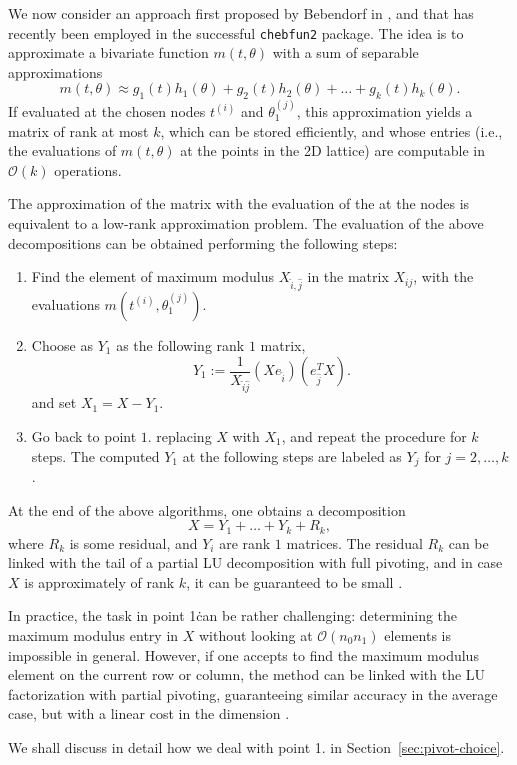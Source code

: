 \documentclass[]{article}
\begin{document}
We now consider an approach first proposed by Bebendorf 
in \cite{bebendorf2003adaptive}, and that has recently been employed in 
the successful \texttt{chebfun2} package. The idea is 
to approximate a bivariate function $m(t, \theta)$ with a 
sum of separable approximations
\[
    m(t, \theta) \approx 
      g_1(t) h_1(\theta) + g_2(t) h_2(\theta) + \ldots 
      + g_k(t) h_k(\theta). 
\]
If evaluated at the chosen nodes $t^{(i)}$ and 
$\theta_1^{(j)}$, this approximation yields a matrix 
of rank at most $k$, which can be stored efficiently, and 
whose entries (i.e., the evaluations of $m(t,\theta)$ at the 
points in the 2D lattice) are computable in $\mathcal O(k)$ 
operations. 

The approximation of the matrix with the  evaluation of the  
at the nodes is equivalent to a low-rank approximation 
problem. The evaluation of the above decompositions 
can be obtained performing the following 
steps:
\begin{enumerate}
    \item Find the element of maximum modulus  $X_{\hat i, \hat j}$
      in the matrix 
      $X_{ij}$, with the evaluations 
      $m(t^{(i)}, \theta_1^{(j)})$. 
    \item Choose as $Y_1$ as the following rank $1$ matrix,
      \[
          Y_1 := \frac{1}{X_{\hat i \hat j}} 
            (X e_{\hat i}) (e_{\hat j}^T X).
      \]
      and set $X_1 = X - Y_1$. 
    \item Go back to point $1.$ replacing $X$ with $X_1$, and repeat 
      the procedure for $k$ steps. The computed $Y_1$ at the following 
      steps are labeled as $Y_j$ for $j = 2, \ldots, k$. 
\end{enumerate}

At the end of the above algorithms, one obtains a decomposition 
\[
    X = Y_1 + \ldots + Y_k + R_k, 
\]
where $R_k$ is some residual, and $Y_i$ are rank $1$ matrices. The 
residual $R_k$ can be linked with the tail of a partial LU decomposition 
with full pivoting, and in case $X$ is approximately of rank $k$, 
it can be guaranteed to be small \cite{bebendorf2003adaptive,townsend2013extension}. 

In practice, the task in point 1\. can be rather challenging: determining the
maximum modulus entry in $X$ without looking at $\mathcal O(n_0 n_1)$ 
elements is impossible in general. However, if one 
accepts to find the maximum modulus element on the current row 
or column, the method can be linked with the LU factorization 
with partial pivoting, guaranteeing similar accuracy 
in the average case, but with a linear cost in the dimension \cite{bebendorf2003adaptive}. 

We shall discuss in detail how we deal with
point 1. in Section~\ref{sec:pivot-choice}. 



\end{document}
